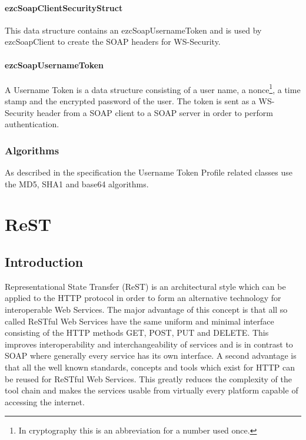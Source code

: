 \documentclass[10pt,final,a4paper,oneside]{article}
\begin{document}
\paragraph{ezcSoapClientSecurityStruct}
This data structure
contains an ezcSoapUsernameToken
and is used by ezcSoapClient
to create the SOAP headers for WS-Security.

\paragraph{ezcSoapUsernameToken}
A Username Token is a data structure
consisting of a user name,
a nonce\footnote{In cryptography this is an abbreviation for a number used once.},
a time stamp
and the encrypted password of the user.
The token is sent as a WS-Security header
from a SOAP client to a SOAP server
in order to perform authentication.


\subsubsection{Algorithms}
As described in the specification
the Username Token Profile related
classes use the MD5, SHA1 and base64 algorithms.






\section{ReST}\label{sec:ReST}
%
\subsection{Introduction}
Representational State Transfer (ReST) is an architectural style
which can be applied to the HTTP protocol \cite{HTTP}
in order to form an alternative technology
for interoperable Web Services.
The major advantage of this concept is
that all so called ReSTful Web Services have
the same uniform and minimal interface
consisting of the HTTP methods
GET, POST, PUT and DELETE.
This improves interoperability
and interchangeability of services and 
is in contrast to SOAP where generally every service
has its own interface.
A second advantage is that all the well known standards, concepts and tools
which exist for HTTP can be reused for ReSTful Web Services.
This greatly reduces the complexity of the tool chain
and makes the services usable from virtually
every platform capable of accessing the internet.
\end{document}
